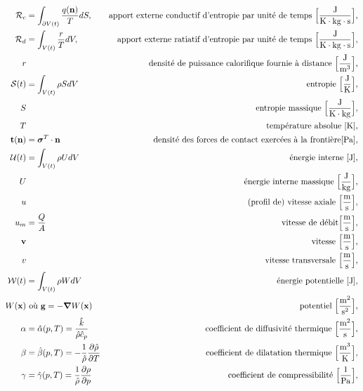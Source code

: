 \begin{align*}
      \mathcal{R}_c &= \int_{\partial V(t)} \frac{q(\vb{n})}{T}dS, & \textrm{apport externe conductif d'entropie par unité de temps }\Big[\si{\frac{J}{K \cdot kg \cdot \s}}\Big],\\
      \mathcal{R}_d &= \int_{V(t)} \frac{r}{T} dV, & \textrm{apport externe ratiatif d'entropie par unité de temps }\Big[\si{\frac{J}{K \cdot kg \cdot s}}\Big],\\
      r & & \textrm{densité de puissance calorifique fournie à distance } \Big[\si{\frac{J}{m^3}}\Big],\\
      \mathcal{S}(t) &= \int_{V(t)} \rho S dV & \textrm{entropie } \Big[\si{\frac{J}{K}}\Big],\\
      S & & \textrm{entropie massique } \Big[\si{\frac{J}{K \cdot kg}}\Big],\\
      T & & \textrm{température absolue } [\si{K}],\\
      \vb{t}(\vb{n}) &= \bs{\sigma}^T \cdot \vb{n} & \textrm{densité des forces de contact exercées à la frontière} [\si{Pa}],\\
      \mathcal{U}(t) &= \int_{V(t)} \rho U dV & \textrm{énergie interne } [\si{J}],\\
      U & & \textrm{énergie interne massique } \Big[\si{\frac{J}{kg}}\Big],\\
      u & & \textrm{(profil de) vitesse axiale } \Big[\si{\frac{m}{s}}\Big],\\
      u_m &= \frac{Q}{A} & \textrm{vitesse de débit} \Big[\si{\frac{m}{s}}\Big],\\
      \vb{v} & & \textrm{vitesse } \Big[\si{\frac{m}{s}}\Big],\\
      v & & \textrm{vitesse transversale } \Big[\si{\frac{m}{s}}\Big],\\
      \mathcal{W}(t) &= \int_{V(t)} \rho W dV & \textrm{énergie potentielle } [\si{J}],\\
      W(\vb{x}) & \textrm{ où } \vb{g} = -\grad W(\vb{x}) & \textrm{potentiel }\Big[\si{\frac{m^2}{s^2}}\Big],\\
      \alpha &= \hat{\alpha}(p,T) = \frac{\hat{k}}{\hat{\rho}\hat{c}_p} & \textrm{coefficient de diffusivité thermique } \Big[\si{\frac{m^2}{s}}\Big], \\
      \beta &= \hat{\beta}(p,T) = -\recip{\hat{\rho}} \pdv{\hat{\rho}}{T} & \textrm{coefficient de dilatation thermique } \Big[\si{\frac{m^3}{K}}\Big],\\
      \gamma &= \hat{\gamma}(p,T) = \recip{\hat{\rho}} \pdv{\rho}{p} & \textrm{coefficient de compressibilité } \Big[\si{\recip{Pa}}\Big],\\

\end{align*}
